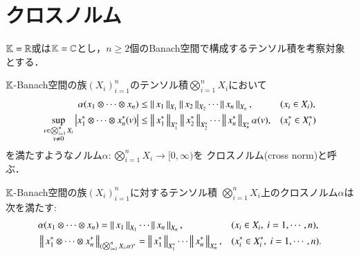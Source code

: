\section{クロスノルム}
	$\mathbb{K} = \mathbb{R}$或は$\mathbb{K}=\mathbb{C}$とし，$n \geq 2$個のBanach空間で構成するテンソル積を考察対象とする．
	\begin{screen}
		\begin{dfn}[クロスノルム]\label{def:cross_norm}
			$\mathbb{K}$-Banach空間の族$(X_i)_{i=1}^n$のテンソル積$\bigotimes_{i=1}^n X_i$において
			\begin{align}
				\alpha(x_1 \otimes \cdots \otimes x_n) &\leq \left\|\, x_1\, \right\|_{X_1} \left\|\, x_2\, \right\|_{X_2} \cdots \left\|\, x_n\, \right\|_{X_n}, && (x_i \in X_i), \label{eq:cross_norm_def_1}\\
				\operatorname*{sup}_{\substack{v \in \bigotimes_{i=1}^n X_i \\ v \neq 0}} \left| x_1^* \otimes \cdots \otimes x_n^* (v) \right| &\leq \left\|\, x_1^*\, \right\|_{X_1^*} \left\|\, x_2^*\, \right\|_{X_2^*} \cdots \left\|\, x_n^*\, \right\|_{X_n^*}\alpha(v),
				&& (x_i^* \in X_i^*) \label{eq:cross_norm_def_2}
			\end{align}
			を満たすようなノルム$\alpha:\bigotimes_{i=1}^n X_i \longrightarrow [0,\infty)$を
			クロスノルム(cross norm)と呼ぶ．
		\end{dfn}
	\end{screen}
	
	\begin{screen}
		\begin{thm}
			$\mathbb{K}$-Banach空間の族$(X_i)_{i=1}^{n}$に対するテンソル積
			$\bigotimes_{i=1}^n X_i$上のクロスノルム$\alpha$は
			次を満たす:
			\begin{align}
				&\alpha(x_1 \otimes \cdots \otimes x_n) 
					= \left\|\, x_1\, \right\|_{X_1} \cdots \left\|\, x_n\, \right\|_{X_n}, && (x_i \in X_i,\ i=1,\cdots,n), \\
				&\left\|\, x_1^* \otimes \cdots \otimes x_n^*\, \right\|_{(\bigotimes_{i=1}^n X_i, \alpha)^*} 
					= \left\|\, x_1^*\, \right\|_{X_1^*} \cdots \left\|\, x_n^*\, \right\|_{X_n^*},
				&& (x_i^* \in X_i^*,\ i=1,\cdots,n).
			\end{align}
		\end{thm}
	\end{screen}
	
